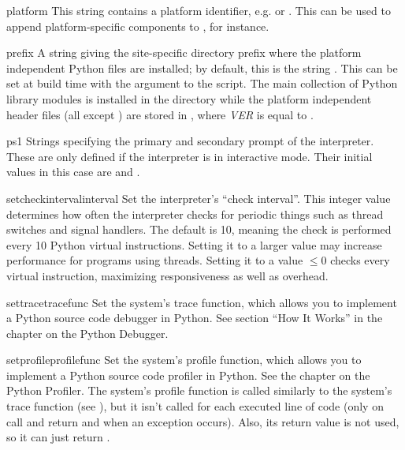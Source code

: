\begin{datadesc}{platform}
This string contains a platform identifier, e.g.  or
.  This can be used to append platform-specific
components to , for instance. 
\end{datadesc}

\begin{datadesc}{prefix}
A string giving the site-specific directory prefix where the platform
independent Python files are installed; by default, this is the string
.  This can be set at build time with the
 argument to the  script.  The main
collection of Python library modules is installed in the directory
 while the platform
independent header files (all except ) are stored in
,
where \emph{VER} is equal to .

\end{datadesc}

\begin{datadesc}{ps1}
  Strings specifying the primary and secondary prompt of the
  interpreter.  These are only defined if the interpreter is in
  interactive mode.  Their initial values in this case are
   and .
\end{datadesc}

\begin{funcdesc}{setcheckinterval}{interval}
Set the interpreter's ``check interval''.  This integer value
determines how often the interpreter checks for periodic things such
as thread switches and signal handlers.  The default is 10, meaning
the check is performed every 10 Python virtual instructions.  Setting
it to a larger value may increase performance for programs using
threads.  Setting it to a value $\leq 0$ checks every virtual instruction,
maximizing responsiveness as well as overhead.
\end{funcdesc}

\begin{funcdesc}{settrace}{tracefunc}
  Set the system's trace function, which allows you to implement a
  Python source code debugger in Python.  See section ``How It Works''
  in the chapter on the Python Debugger.
\end{funcdesc}

\begin{funcdesc}{setprofile}{profilefunc}
  Set the system's profile function, which allows you to implement a
  Python source code profiler in Python.  See the chapter on the
  Python Profiler.  The system's profile function
  is called similarly to the system's trace function (see
  ), but it isn't called for each executed line of
  code (only on call and return and when an exception occurs).  Also,
  its return value is not used, so it can just return .
\end{funcdesc}

